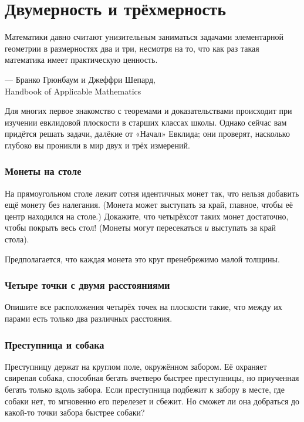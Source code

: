 \chapter{Двумерность и трёхмерность}

\setlength{\epigraphwidth}{.83\textwidth}
\epigraph{Математики давно считают унизительным заниматься задачами элементарной геометрии в размерностях два и три, несмотря на то, что как раз такая математика имеет практическую ценность.}{--- Бранко Грюнбаум и Джеффри Шепард,\\ Handbook of Applicable Mathematics}

Для многих первое знакомство с теоремами и доказательствами
происходит при изучении евклидовой плоскости
в старших классах школы.
Однако сейчас вам придётся решать задачи, далёкие от «Начал» Евклида;
они проверят, насколько глубоко вы проникли в мир двух и трёх измерений.

\subsection*{Монеты на столе}\label{Монеты на столе}

На прямоугольном столе лежит сотня идентичных монет так, что нельзя добавить ещё монету без налегания.
(Монета может выступать за край, главное, чтобы её центр находился на столе.)
Докажите, что четырёхсот таких монет достаточно, чтобы покрыть весь стол!
(Монеты могут пересекаться \emph{и} выступать за край стола).

Предполагается, что каждая монета это круг пренебрежимо малой толщины.

\subsection*{Четыре точки с двумя расстояниями}

Опишите все расположения четырёх точек на плоскости такие, что между их парами есть только два различных расстояния.

\subsection*{Преступница и собака}

Преступницу держат на круглом  поле, окружённом забором.
Её охраняет свирепая собака, способная бегать вчетверо быстрее преступницы, но приученная бегать только вдоль забора.
Если преступница подбежит к забору в месте, где собаки нет, то мгновенно его перелезет и сбежит.
Но сможет ли она добраться до какой-то точки забора быстрее собаки?

